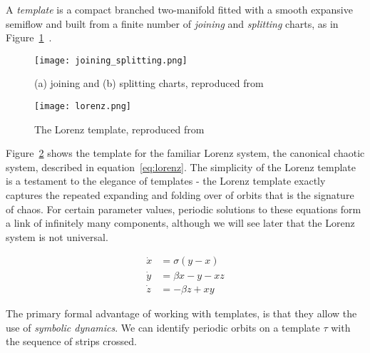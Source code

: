 \documentclass[paper.tex]{subfiles}
\begin{document}
\begin{definition}[Template]
  A \emph{template} is a compact branched two-manifold fitted with a smooth expansive semiflow and built from a finite number of \emph{joining} and \emph{splitting} charts, as in Figure~\ref{fig:joinsplit}~\cite{knottyode}.
\end{definition}


\begin{figure}[h]
  \centering
  \texttt{[image: joining\_splitting.png]}
  \caption[what goes here]{(a) joining and (b) splitting charts, reproduced from~\cite{knottyode}\protect\footnotemark}\label{fig:joinsplit}
\end{figure}


\begin{figure}[h]
  \centering
  \texttt{[image: lorenz.png]}
  \caption{The Lorenz template, reproduced from~\cite{knottyode}}\label{fig:lorenz}
\end{figure}

Figure~\ref{fig:lorenz} shows the template for the familiar Lorenz system, the canonical chaotic system, described in equation~\ref{eq:lorenz}. The simplicity of the Lorenz template is a testament to the elegance of
templates - the Lorenz template exactly captures the repeated expanding and folding over of orbits that is the signature of chaos. For certain parameter values, periodic solutions to these equations form a link of infinitely
many components, although we will see later that the Lorenz system is not universal.

\begin{align*}
  \label{eq:lorenz}
  \dot{x} &= \sigma(y - x ) \\
  \dot{y} &= \beta x - y - x z \\
  \dot{z} &= - \beta z + x y
\end{align*}

The primary formal advantage of working with templates, is that they allow the use of \emph{symbolic dynamics}. We can identify periodic orbits on a template $\tau$ with the sequence of strips crossed.
\end{document}
